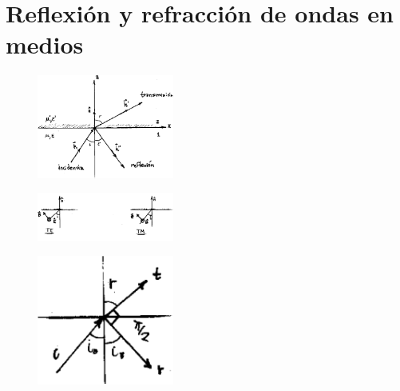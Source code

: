 \documentclass[10pt,oneside]{CBFT_book}
\begin{document}
\section{Reflexión y refracción de ondas en medios}

\begin{figure}[htb]
	\begin{center}
	\includegraphics[width=0.4\textwidth]{images/fig_ft1_reflex1.pdf}	 
	\end{center}
	\caption{}
\end{figure} 

\begin{figure}[htb]
	\begin{center}
	\includegraphics[width=0.4\textwidth]{images/fig_ft1_reflex2.pdf}	 
	\end{center}
	\caption{}
\end{figure} 

\begin{figure}[htb]
	\begin{center}
	\includegraphics[width=0.4\textwidth]{images/fig_ft1_reflex3.pdf}	 
	\end{center}
	\caption{}
\end{figure} 
\end{document}

